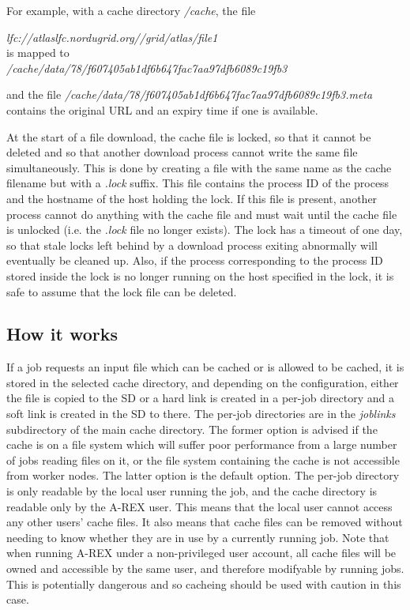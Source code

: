 \documentclass{article}                            %
\begin{document}
For example, with a cache directory \emph{/cache}, the file 

\begin{center}
\emph{lfc://atlaslfc.nordugrid.org//grid/atlas/file1 }\\
is mapped to\\
\emph{/cache/data/78/f607405ab1df6b647fac7aa97dfb6089c19fb3}
\par\end{center}

and the file \emph{/cache/data/78/f607405ab1df6b647fac7aa97dfb6089c19fb3.meta
}contains the original URL and an expiry time if one is available.

At the start of a file download, the cache file is locked, so that
it cannot be deleted and so that another download process cannot write
the same file simultaneously. This is done by creating a file with the
same name as the cache filename but with a \emph{.lock} suffix. This
file contains the process ID of the process and the hostname of the
host holding the lock. If this file is present, another process cannot
do anything with the cache file and must wait until the cache file
is unlocked (i.e. the \emph{.lock} file no longer exists). The lock
has a timeout of one day, so that stale locks left behind by a download
process exiting abnormally will eventually be cleaned up. Also, if
the process corresponding to the process ID stored inside the lock
is no longer running on the host specified in the lock, it is safe
to assume that the lock file can be deleted.


\subsection{How it works}

If a job requests an input file which can be cached or is allowed to
be cached, it is stored in the selected cache directory, and depending
on the configuration, either the file is copied to the SD or a hard
link is created in a per-job directory and a soft link is created in
the SD to there. The per-job directories are in the \emph{joblinks}
subdirectory of the main cache directory. The former option is advised
if the cache is on a file system which will suffer poor performance
from a large number of jobs reading files on it, or the file system
containing the cache is not accessible from worker nodes. The latter
option is the default option. The per-job directory is only readable
by the local user running the job, and the cache directory is readable
only by the A-REX user. This means that the local user cannot access
any other users' cache files. It also means that cache files can be
removed without needing to know whether they are in use by a currently
running job. Note that when running A-REX under a non-privileged user
account, all cache files will be owned and accessible by the same
user, and therefore modifyable by running jobs. This is potentially
dangerous and so cacheing should be used with caution in this case.
\end{document}
